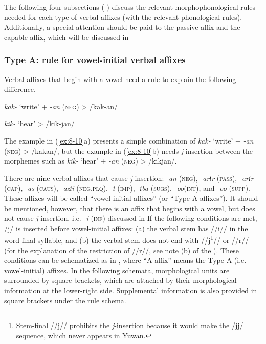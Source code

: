 The following four subsections (-) discuss the relevant morphophonological rules needed for each type of verbal affixes (with the relevant phonological rules). Additionally, a special attention should be paid to the passive affix and the capable affix, which will be discussed in 

\subsubsection{Type A: rule for vowel-initial verbal affixes}

Verbal affixes that begin with a vowel need a rule to explain the following difference.

\ea\label{ex:8-10}
\ea \textit{kak-}  ‘write’  +  \textit{-an} (\textsc{neg})  >  /kak-an/


\ex \textit{kik-}  ‘hear’        >  /kik-jan/
\z
\z

The example in (\ref{ex:8-10}a) presents a simple combination of \textit{kak-} ‘write’ + \textit{-an} (\textsc{neg}) > /kakan/, but the example in (\ref{ex:8-10}b) needs \textit{j}-insertion between the morphemes such as \textit{kik-} ‘hear’ + \textit{-an} (\textsc{neg}) > /kikjan/.

There are nine verbal affixes that cause \textit{j}-insertion: \textit{-an} (\textsc{neg}), \textit{-arɨr} (\textsc{pass}), \textit{-arɨr} (\textsc{cap}), \textit{-as} (\textsc{caus}), \textit{-azɨi} (\textsc{neg}.\textsc{plq}), \textit{-ɨ} (\textsc{imp}), \textit{-ɨba} (\textsc{sugs}), \textit{-oo}(\textsc{int}), and \textit{-oo} (\textsc{supp}). These affixes will be called “vowel-initial affixes” (or “Type-A affixes”). It should be mentioned, however, that there is an affix that begins with a vowel, but does not cause \textit{j}-insertion, i.e. \textit{-i} (\textsc{inf}) discussed in  If the following conditions are met, /j/ is inserted before vowel-initial affixes: (a) the verbal stem has //i// in the word-final syllable, and (b) the verbal stem does not end with //j\footnote{Stem-final //j// prohibits the \textit{j}-insertion because it would make the /jj/ sequence, which never appears in Yuwan.}// or //r// (for the explanation of the restriction of //r//, see note (b) of the ). These conditions can be schematized as in , where “A-affix” means the Type-A (i.e. vowel-initial) affixes. In the following schemata, morphological units are surrounded by square brackets, which are attached by their morphological information at the lower-right side. Supplemental information is also provided in square brackets under the rule schema.

